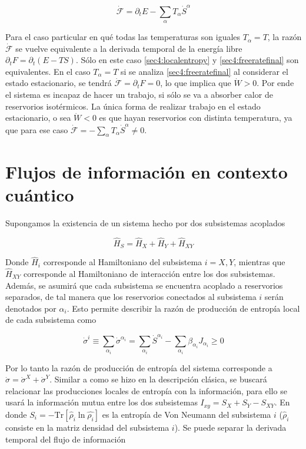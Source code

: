 \begin{equation*}
    \dot{\mathcal{F}} = \partial_{t}E - \sum_{\alpha}T_{\alpha} \dot{S}^{\alpha}
\end{equation*}

Para el caso particular en qué todas las temperaturas son iguales $T_{\alpha} = T$, la razón $\dot{\mathcal{F}}$ se vuelve equivalente a la derivada temporal de la energía libre $\partial_{t}F = \partial_{t}(E-TS)$. Sólo en este caso \ref{sec4:localentropy} y \ref{sec4:freeratefinal} son equivalentes. En el caso $T_{\alpha}=T$ si se analiza \ref{sec4:freeratefinal} al considerar el estado estacionario, se tendrá $\dot{\mathcal{F}} = \partial_{t}F = 0$, lo que implica que $\dot{W}>0$. Por ende el sistema es incapaz de hacer un trabajo, si sólo se va a absorber calor de reservorios isotérmicos. La única forma de realizar trabajo en el estado estacionario, o sea $\dot{W}<0$ es que hayan reservorios con distinta temperatura, ya que para ese caso $\dot{\mathcal{F}} = - \sum_{\alpha} T_{\alpha} \dot{S}^{\alpha} \neq 0$.   

\section{Flujos de información en contexto cuántico}
Supongamos la existencia de un sistema hecho por dos subsistemas acoplados

\begin{equation*}
    \hat{H}_{S} = \hat{H}_{X} + \hat{H}_{Y} + \hat{H}_{XY} 
\end{equation*}

Donde $\hat{H}_{i}$ corresponde al Hamiltoniano del subsistema $i=X,Y$, mientras que $\hat{H}_{XY}$ corresponde al Hamiltoniano de interacción entre los dos subsistemas. Además, se asumirá que cada subsistema se encuentra acoplado a reservorios separados, de tal manera que los reservorios conectados al subsistema $i$ serán denotados por $\alpha_{i}$. Esto permite describir la razón de producción de entropía local de cada subsistema como

\begin{equation*}
    \dot{\sigma}^{i} \equiv \sum_{\alpha_{i}} \dot{\sigma}^{\alpha_{i}} = \sum_{\alpha_{i}} \dot{S}^{\alpha_{i}} - \sum_{\alpha_{i}} \beta_{\alpha_{i}} J_{\alpha_{i}} \geq 0
\end{equation*}

Por lo tanto la razón de producción de entropía del sistema corresponde a $\dot{\sigma} = \dot{\sigma}^{X} + \dot{\sigma}^{Y}$. Similar a como se hizo en la descripción clásica, se buscará relacionar las producciones locales de entropía con la información, para ello se usará la información mutua entre los dos subsistemas $I_{xy} = S_{X} + S_{Y} - S_{XY}$. En donde $S_{i} = - \text{Tr}[ \hat{\rho}_{i}\ln \hat{\rho_{i}}]$ es la entropía de Von Neumann del subsistema $i$ ($\hat{\rho}_{i}$ consiste en la matriz densidad del subsistema $i$). Se puede separar la derivada temporal del flujo de información


